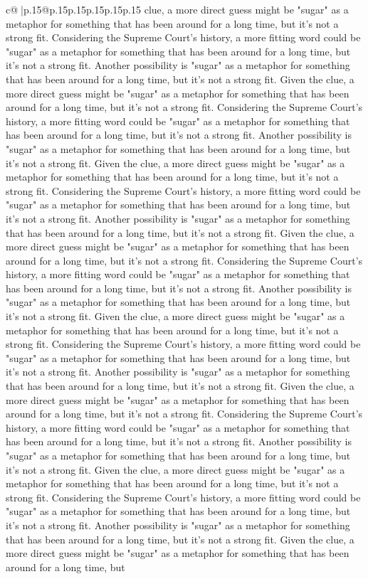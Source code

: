 \documentclass{article}
\begin{document}
{\begin{supertabular}{c@{$\;$}|p{.15\linewidth}@{}p{.15\linewidth}p{.15\linewidth}p{.15\linewidth}p{.15\linewidth}p{.15\linewidth}}
{{{clue, a more direct guess might be "sugar" as a metaphor for something that has been around for a long time, but it's not a strong fit. Considering the Supreme Court's history, a more fitting word could be "sugar" as a metaphor for something that has been around for a long time, but it's not a strong fit. Another possibility is "sugar" as a metaphor for something that has been around for a long time, but it's not a strong fit. Given the clue, a more direct guess might be "sugar" as a metaphor for something that has been around for a long time, but it's not a strong fit. Considering the Supreme Court's history, a more fitting word could be "sugar" as a metaphor for something that has been around for a long time, but it's not a strong fit. Another possibility is "sugar" as a metaphor for something that has been around for a long time, but it's not a strong fit. Given the clue, a more direct guess might be "sugar" as a metaphor for something that has been around for a long time, but it's not a strong fit. Considering the Supreme Court's history, a more fitting word could be "sugar" as a metaphor for something that has been around for a long time, but it's not a strong fit. Another possibility is "sugar" as a metaphor for something that has been around for a long time, but it's not a strong fit. Given the clue, a more direct guess might be "sugar" as a metaphor for something that has been around for a long time, but it's not a strong fit. Considering the Supreme Court's history, a more fitting word could be "sugar" as a metaphor for something that has been around for a long time, but it's not a strong fit. Another possibility is "sugar" as a metaphor for something that has been around for a long time, but it's not a strong fit. Given the clue, a more direct guess might be "sugar" as a metaphor for something that has been around for a long time, but it's not a strong fit. Considering the Supreme Court's history, a more fitting word could be "sugar" as a metaphor for something that has been around for a long time, but it's not a strong fit. Another possibility is "sugar" as a metaphor for something that has been around for a long time, but it's not a strong fit. Given the clue, a more direct guess might be "sugar" as a metaphor for something that has been around for a long time, but it's not a strong fit. Considering the Supreme Court's history, a more fitting word could be "sugar" as a metaphor for something that has been around for a long time, but it's not a strong fit. Another possibility is "sugar" as a metaphor for something that has been around for a long time, but it's not a strong fit. Given the clue, a more direct guess might be "sugar" as a metaphor for something that has been around for a long time, but it's not a strong fit. Considering the Supreme Court's history, a more fitting word could be "sugar" as a metaphor for something that has been around for a long time, but it's not a strong fit. Another possibility is "sugar" as a metaphor for something that has been around for a long time, but it's not a strong fit. Given the clue, a more direct guess might be "sugar" as a metaphor for something that has been around for a long time, but }}}
\end{supertabular}}
\end{document}
